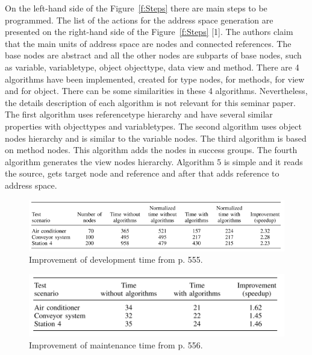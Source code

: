 \documentclass[conference]{IEEEtran}
\begin{document}
On the left-hand side of the Figure~\ref{f:Steps} there are main steps to be programmed. The list of the actions for the address space generation are presented on the right-hand side of the Figure~\ref{f:Steps} [1]. The authors claim that the main units of address space are nodes and connected references. The base nodes are abstract and all the other nodes are subparts of base nodes, such as variable, variabletype, object objecttype, data view and method. There are 4 algorithms have been implemented, created for type nodes, for methods, for view and for object. There can be some similarities in these 4 algorithms. Nevertheless, the details description of each algorithm is not relevant for this seminar paper. The first algorithm uses referencetype hierarchy and have several similar properties with objecttypes and variabletypes. The second algorithm uses object nodes hierarchy and is similar to the variable nodes. The third algorithm is based on method nodes. This algorithm adds the nodes in success groups. The fourth algorithm generates the view nodes hierarchy. Algorithm 5 is simple and it reads the source, gets target node and reference and after that adds reference to address space\cite{addressspace2012efficient}. 

\begin{figure}[ht]
\centering
\includegraphics[width= 1\linewidth]{Figures/Table1new}\quad
\caption[Subfigure example]{\label{f:Table1new} Improvement of development time from \cite{addressspace2012efficient} p. 555.}

\end{figure}

\begin{figure}[ht]
\centering
\includegraphics[width= 1\linewidth]{Figures/Table2new}\quad
\caption[Subfigure example]{\label{f:Table2new} Improvement of maintenance time  from \cite{addressspace2012efficient} p. 556.}
\end{figure}
\end{document}
